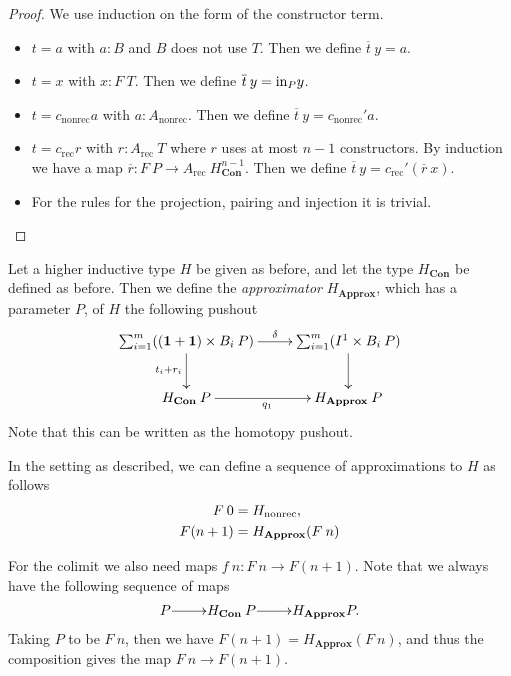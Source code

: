 \documentclass[a4paper,UKenglish]{lipics-v2016}
\newcommand{\inn}{{\rm in}}
\newcommand{\one}[0]{\textbf{1}}
\newcommand{\rec}[0]{\operatorname{rec}}
\newcommand{\nonrec}[0]{\operatorname{nonrec}}
\newcommand{\Con}[0]{\textbf{Con}}
\newcommand{\Approx}[0]{\textbf{Approx}}
\begin{document}
\begin{proof}
We use induction on the form of the constructor term.
\begin{itemize}
	\item $t = a$ with $a : B$ and $B$ does not use $T$. Then we define $\overline{t} \> y = a$.
	\item $t = x$ with $x : F \> T$. Then we define $\overline{t} \> y = \inn_P y$.
	\item $t = c_{\nonrec} a$ with $a : A_{\nonrec}$. Then we define $\overline{t} \> y = c_{\nonrec}' a$.
	\item $t = c_{\rec} r$ with $r : A_{\rec} \> T$ where $r$ uses at most $n-1$ constructors. 
			  By induction we have a map $\overline{r} : F \> P \rightarrow A_{\rec} \> H_{\Con}^{n-1}$.
			  Then we define $\overline{t} \> y = c_{\rec}' (\overline{r} \> x)$.
	\item For the rules for the projection, pairing and injection it is trivial. \qedhere
\end{itemize}
\end{proof}

\begin{definition}
Let a higher inductive type $H$ be given as before, and let the type $H_{\Con}$ be defined as before.
Then we define the \emph{approximator} $H_{\Approx}$, which has a parameter $P$, of $H$ the following pushout
\[
\xymatrix
{
	\sum_{i = 1}^m ((\one + \one) \times B_i \> P) \ar[d]_{t_i + r_i} \ar[r]^-\delta & \sum_{i = 1}^m (I^1 \times B_i \> P) \ar[d]\\
	H_{\Con} \> P \ar[r]_{q_1} & H_{\Approx} \> P
}
\]
Note that this can be written as the homotopy pushout.
\end{definition}

\begin{definition}
In the setting as described, we can define a sequence of approximations to $H$ as follows
\begin{align*}
F \> 0 &= H_{\nonrec},\\
F(n+1) &= H_{\Approx}(F \> n) \qedhere
\end{align*}
\end{definition}

For the colimit we also need maps $f \> n : F \> n \rightarrow F(n + 1)$.
Note that we always have the following sequence of maps
\[
\xymatrix@1
{
	P \ar[r] & H_{\Con} \> P \ar[r] & H_{\Approx} P.
}
\]
Taking $P$ to be $F \> n$, then we have $F (n+1) = H_{\Approx} (F \> n)$, and thus the composition gives the map $F \> n \rightarrow F(n + 1)$.
\end{document}
